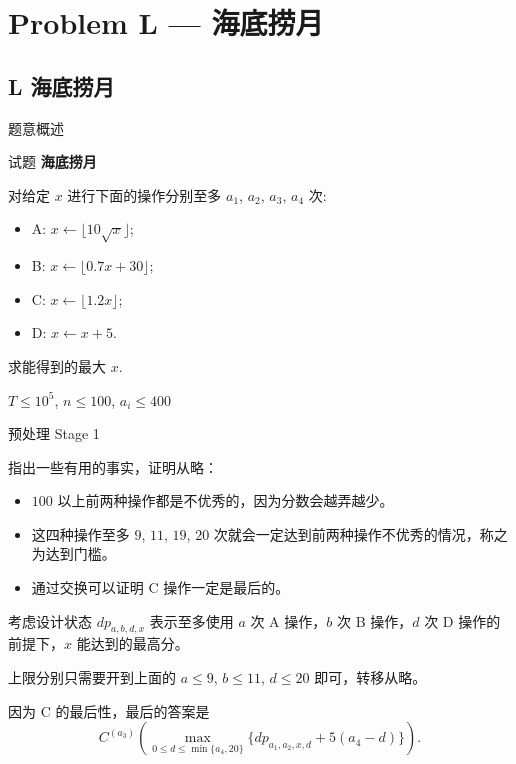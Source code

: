 \documentclass{beamer}
\newcommand{\TT}[1] {{\ttfamily #1}}
\newcommand{\BF}[1] {\textbf{#1}}
\begin{document}
{

\section[L]{Problem L — 海底捞月}
\subsection{L 海底捞月}

\begin{frame}{题意概述}

\begin{center}
试题 \myboxxii{      \BF{\TT{L}}} \BF{海底捞月}
\end{center}


对给定 $x$ 进行下面的操作分别至多 $a_1$, $a_2$, $a_3$, $a_4$ 次:

\begin{itemize}
  \item A: $x \leftarrow \lfloor 10\sqrt{x} \rfloor$;
  \item B: $x \leftarrow \lfloor 0.7x + 30 \rfloor$;
  \item C: $x \leftarrow \lfloor 1.2x \rfloor$;
  \item D: $x \leftarrow x + 5$.
\end{itemize}

求能得到的最大 $x$.

$T \le 10^5$, $n \le 100$, $a_i \le 400$

\end{frame}


\begin{frame}{预处理 Stage 1}

指出一些有用的事实，证明从略：
\begin{itemize}
  \item $100$ 以上前两种操作都是不优秀的，因为分数会越弄越少。
  \item 这四种操作至多 $9$, $11$, $19$, $20$ 次就会一定达到前两种操作不优秀的情况，称之为达到门槛。
  \item 通过交换可以证明 C 操作一定是最后的。
\end{itemize}

考虑设计状态 $dp_{a, b, d, x}$ 表示至多使用 $a$ 次 A 操作，$b$ 次 B 操作，$d$ 次 D 操作的前提下，$x$ 能达到的最高分。

上限分别只需要开到上面的 $a \le 9$, $b \le 11$, $d \le 20$ 即可，转移从略。

因为 C 的最后性，最后的答案是 \[
  C^{(a_3)}(\max_{0 \le d \le \min\{a_4, 20\}}\{dp_{a_1, a_2, x, d} + 5(a_4 - d)\}).
\]




\end{frame}}
\end{document}
